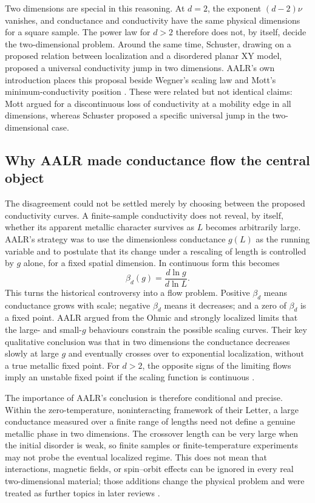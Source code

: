 \documentclass[11pt,a4paper]{article}
\numberwithin{equation}{section}
\begin{document}
Two dimensions are special in this reasoning. At $d=2$, the exponent
$(d-2)\nu$ vanishes, and conductance and conductivity have the same
physical dimensions for a square sample. The power law for $d>2$ therefore
does not, by itself, decide the two-dimensional problem. Around the same
time, Schuster, drawing on a proposed relation between localization and a
disordered planar XY model, proposed a universal conductivity jump in
two dimensions. AALR's own introduction places this proposal beside
Wegner's scaling law and Mott's minimum-conductivity position
\cite{AharonyImry1977,Schuster1978,AALR1979}. These were related but
not identical claims: Mott argued for a discontinuous loss of conductivity
at a mobility edge in all dimensions, whereas Schuster proposed a specific
universal jump in the two-dimensional case.

\subsection{Why AALR made conductance flow the central object}

The disagreement could not be settled merely by choosing between the
proposed conductivity curves. A finite-sample conductivity does not
reveal, by itself, whether its apparent metallic character survives as
$L$ becomes arbitrarily large. AALR's strategy was to use the dimensionless
conductance $g(L)$ as the running variable and to postulate that its
change under a rescaling of length is controlled by $g$ alone, for a fixed
spatial dimension. In continuous form this becomes
\begin{equation}
    \beta_d(g) = \frac{d\ln g}{d\ln L}.
    \label{eq:history-beta}
\end{equation}
This turns the historical controversy into a flow problem. Positive
$\beta_d$ means conductance grows with scale; negative $\beta_d$ means
it decreases; and a zero of $\beta_d$ is a fixed point. AALR argued from
the Ohmic and strongly localized limits that the large- and small-$g$
behaviours constrain the possible scaling curves. Their key qualitative
conclusion was that in two dimensions the conductance decreases slowly at
large $g$ and eventually crosses over to exponential localization, without
a true metallic fixed point. For $d>2$, the opposite signs of the limiting
flows imply an unstable fixed point if the scaling function is continuous
\cite{AALR1979}.

The importance of AALR's conclusion is therefore conditional and precise.
Within the zero-temperature, noninteracting framework of their Letter, a
large conductance measured over a finite range of lengths need not define
a genuine metallic phase in two dimensions. The crossover length can be
very large when the initial disorder is weak, so finite samples or
finite-temperature experiments may not probe the eventual localized
regime. This does not mean that interactions, magnetic fields, or
spin--orbit effects can be ignored in every real two-dimensional material;
those additions change the physical problem and were treated as further
topics in later reviews \cite{LeeRamakrishnan1985}.
\end{document}
